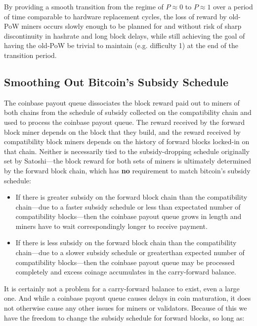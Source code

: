 By providing a smooth transition from the regime of $P \approx 0$ to
$P \approx 1$ over a period of time comparable to hardware replacement
cycles, the loss of reward by old-PoW miners occurs slowly enough to
be planned for and without risk of sharp discontinuity in hashrate and
long block delays, while still achieving the goal of having the
old-PoW be trivial to maintain (e.g. difficulty \num{1}) at the end of
the transition period.

\subsection{Smoothing Out Bitcoin's Subsidy Schedule}

The coinbase payout queue dissociates the block reward paid out to
miners of both chains from the schedule of subsidy collected on the
compatibility chain and used to process the coinbase payout queue.
The reward received by the forward block miner depends on the block
that they build, and the reward received by compatibility block miners
depends on the history of forward blocks locked-in on that chain.
Neither is necessarily tied to the subsidy-dropping schedule
originally set by Satoshi---the block reward for both sets of miners
is ultimately determined by the forward block chain, which has
\textbf{no} requirement to match bitcoin's subsidy schedule:

\begin{itemize}
  \item
    If there is greater subsidy on the forward block chain than the
    compatibility chain---due to a faster subsidy schedule or less
    than expectated number of compatibility blocks---then the coinbase
    payout queue grows in length and miners have to wait
    correspondingly longer to receive payment.

  \item
    If there is less subsidy on the forward block chain than the
    compatibility chain---due to a slower subsidy schedule or
    greaterthan expected number of compatibility blocks---then the
    coinbase payout queue may be processed completely and excess
    coinage accumulates in the carry-forward balance.
\end{itemize}

It is certainly not a problem for a carry-forward balance to exist,
even a large one.  And while a coinbase payout queue causes delays in
coin maturation, it does not otherwise cause any other issues for
miners or validators.  Because of this we have the freedom to change
the subsidy schedule for forward blocks, so long as:

